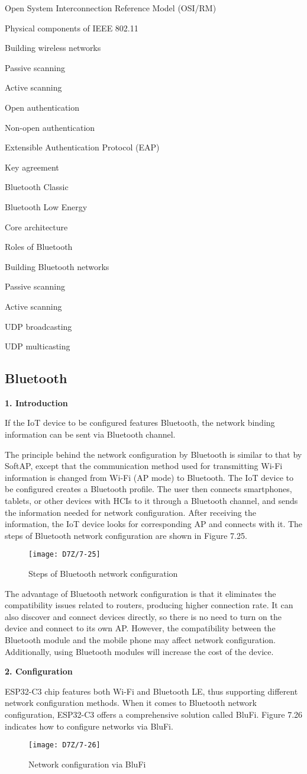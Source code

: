 \documentclass[a4paper,12pt]{book}
\begin{document}
\begin{term}{Open System Interconnection Reference Model (OSI/RM)}
\begin{term}{Physical components of IEEE 802.11}
\begin{term}{Building wireless networks}
\begin{term}{Passive scanning}
\begin{term}{Active scanning}
\begin{term}{Open authentication}
\begin{term}{Non-open authentication}
\begin{term}{Extensible Authentication Protocol (EAP)}
\begin{term}{Key agreement}
\begin{term}{Bluetooth Classic}
\begin{term}{Bluetooth Low Energy}
\begin{term}{Core architecture}
\begin{term}{Roles of Bluetooth}
\begin{term}{Building Bluetooth networks}
\begin{term}{Passive scanning}
\begin{term}{Active scanning}
\begin{term}{UDP broadcasting}
\begin{term}{UDP multicasting}
\subsection{Bluetooth}
\textbf{1. Introduction}

If the IoT device to be configured features Bluetooth, the network binding information can be sent via Bluetooth channel.

The principle behind the network configuration by Bluetooth is similar to that by SoftAP, except that the communication method used for transmitting Wi-Fi information is changed from Wi-Fi (AP mode) to Bluetooth. The IoT device to be configured creates a Bluetooth profile. The user then connects smartphones, tablets, or other devices with HCIs to it through a Bluetooth channel, and sends the information needed for network configuration. After receiving the information, the IoT device looks for corresponding AP and connects with it. The steps of Bluetooth network configuration are shown in Figure 7.25.

\begin{figure}[!h]
    \centering
    \texttt{[image: D7Z/7-25]}
    \caption{Steps of Bluetooth network configuration}
\end{figure}

The advantage of Bluetooth network configuration is that it eliminates the compatibility issues related to routers, producing higher connection rate. It can also discover and connect devices directly, so there is no need to turn on the device and connect to its own AP. However, the compatibility between the Bluetooth module and the mobile phone may affect network configuration. Additionally, using Bluetooth modules will increase the cost of the device.

\textbf{2. Configuration}

ESP32-C3 chip features both Wi-Fi and Bluetooth LE, thus supporting different network configuration methods. When it comes to Bluetooth network configuration, ESP32-C3 offers a comprehensive solution called BluFi. Figure 7.26 indicates how to configure networks via BluFi.

\begin{figure}[!h]
    \centering
    \texttt{[image: D7Z/7-26]}
    \caption{Network configuration via BluFi}
\end{figure}


\end{term}
\end{term}
\end{term}
\end{term}
\end{term}
\end{term}
\end{term}
\end{term}
\end{term}
\end{term}
\end{term}
\end{term}
\end{term}
\end{term}
\end{term}
\end{term}
\end{term}
\end{term}
\end{document}
